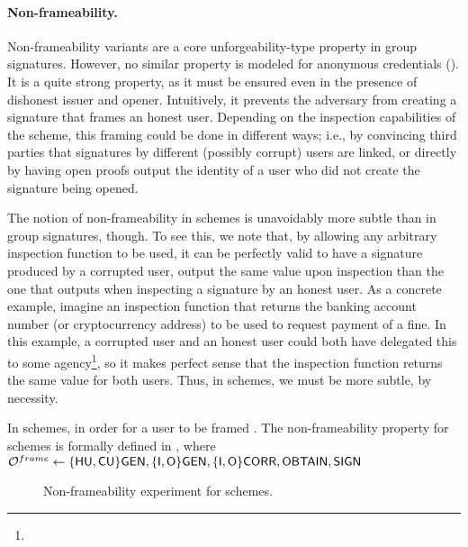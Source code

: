 \paragraph{Non-frameability.} %
Non-frameability variants are a core unforgeability-type property in group
signatures. However, no
similar property is modeled for anonymous credentials (). It is a quite strong
property, as it must be ensured even in the presence of dishonest issuer and
opener. Intuitively, it prevents the adversary from creating a signature that
frames an honest user. Depending on the inspection capabilities of the scheme,
this framing could be done in different ways; i.e., by convincing third parties
that signatures by different (possibly corrupt) users are linked, or directly
by having open proofs output the identity of a user who did not create the
signature being opened.
%

The notion of non-frameability in \UAS schemes is unavoidably more subtle than
in group signatures, though. To see this, we note that, by allowing any
arbitrary inspection function \finsp to be used, it can be perfectly valid to
have a signature produced by a corrupted user, output the same \y value upon
inspection than the one that \finsp outputs when inspecting a signature by an
honest user. As a concrete example, imagine an inspection function that returns
the banking account number (or cryptocurrency address) to be used to request
payment of a fine. In this example, a corrupted user and an honest user could
both have delegated this to some agency\footnote{}, so it makes perfect sense that the inspection function
returns the same value for both users.
%
Thus, in \UAS schemes, we must be more subtle, by necessity.

In \UAS schemes, in order for a user to be framed . The
non-frameability property for \UAS schemes is formally defined in
, where $\mathcal{O}^{frame} \gets \lbrace\mathsf{HU},\mathsf{CU}\rbrace\mathsf{GEN},
\lbrace\mathsf{I},\mathsf{O}\rbrace\mathsf{GEN},\lbrace\mathsf{I},\mathsf{O}\rbrace\mathsf{CORR},\mathsf{OBTAIN},\mathsf{SIGN}$

\begin{figure}[htp!]
  \caption{Non-frameability experiment for \UAS schemes.}
  \label{fig:exp-uas-frame}
\end{figure}


